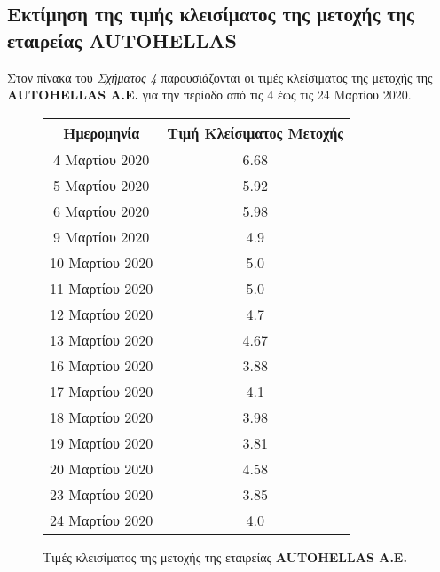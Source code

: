 \documentclass[Second Project.tex]{subfiles}
\begin{document}
\subsection{ Εκτίμηση της τιμής κλεισίματος της μετοχής της εταιρείας \textlatin{\textbf{AUTOHELLAS}}  }
Στον πίνακα του \textit{Σχήματος 4} παρουσιάζονται οι τιμές κλείσιματος της μετοχής της 
\textlatin{\textbf{AUTOHELLAS A.E.}} για την περίοδο από τις 4 έως τις 24 Μαρτίου 2020.
\begin{figure}[h!]
    \centering
    \captionsetup{justification=centering}
    \begin{center}
        \begin{tabular}{ |c|c| } 
        \hline
        Ημερομηνία & Τιμή Κλείσιματος Μετοχής \\ \hline
        4 Μαρτίου 2020 & 6.68 \\ \hline
        5 Μαρτίου 2020 & 5.92 \\ \hline
        6 Μαρτίου 2020 & 5.98 \\  \hline
        9 Μαρτίου 2020 & 4.9 \\ \hline
        10 Μαρτίου 2020 & 5.0 \\  \hline
        11 Μαρτίου 2020 & 5.0 \\ \hline
        12 Μαρτίου 2020 & 4.7 \\ \hline
        13 Μαρτίου 2020 & 4.67 \\ \hline
        16 Μαρτίου 2020 & 3.88 \\ \hline
        17 Μαρτίου 2020 & 4.1 \\ \hline
        18 Μαρτίου 2020 & 3.98 \\ \hline
        19 Μαρτίου 2020 & 3.81 \\ \hline
        20 Μαρτίου 2020 & 4.58 \\ \hline
        23 Μαρτίου 2020 & 3.85 \\ \hline
        24 Μαρτίου 2020 & 4.0 \\ \hline
        \hline
        \end{tabular}
        \caption{Τιμές κλεισίματος της μετοχής της εταιρείας \textlatin{\textbf{AUTOHELLAS A.E.}}}
    \end{center}
\end{figure}
\end{document}
